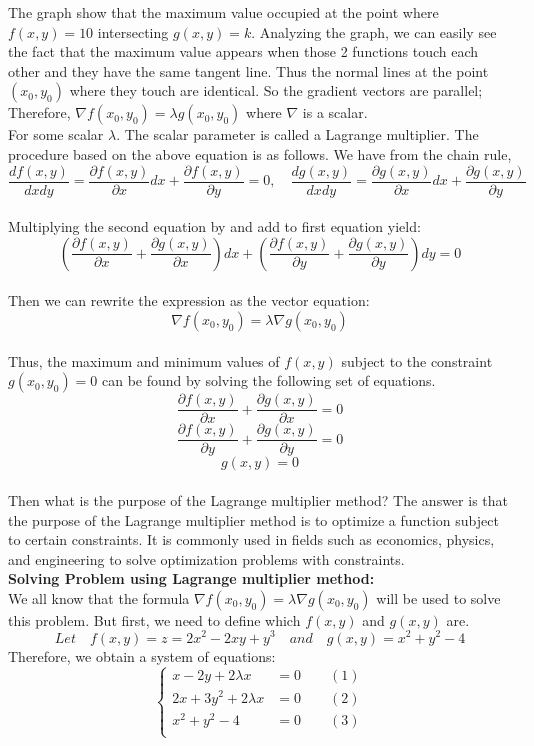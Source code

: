 The graph show that the maximum value occupied at the point where $f(x,y)=10$ intersecting $g(x,y)=k$. Analyzing the graph, we can easily see the fact that the maximum value appears when those 2 functions touch each other and they have the same tangent line. Thus the normal lines at the point $(x_0,y_0)$ where they touch are identical. So the gradient vectors are parallel; Therefore, $\nabla f(x_0,y_0) = \lambda g(x_0,y_0)$ where $\nabla$ is a scalar. \\
For some scalar $\lambda$. The scalar parameter is called a Lagrange multiplier. The procedure based on the above equation is as follows. We have from the chain rule,
$$ \dfrac{df(x, y)}{dxdy} = \dfrac{\partial f(x, y)}{\partial x} dx + \dfrac{\partial f(x, y)}{\partial y} = 0,\quad \dfrac{dg(x, y)}{dxdy} = \dfrac{\partial g(x, y)}{\partial x} dx + \dfrac{\partial g(x, y)}{\partial y} $$ \\[6pt]
Multiplying the second equation by and add to first equation yield:
$$ \left( \dfrac{\partial f(x, y)}{\partial x} + \dfrac{\partial g(x, y)}{\partial x} \right)dx + \left( \dfrac{\partial f(x, y)}{\partial y} + \dfrac{\partial g(x, y)}{\partial y} \right)dy = 0 $$\\[6pt]
Then we can rewrite the expression as the vector equation:
$$ \nabla f(x_0, y_0) =\lambda \nabla g(x_0, y_0) $$\\[6pt]
Thus, the maximum and minimum values of $f(x,y)$ subject to the constraint $g(x_0,y_0)=0$  can be found by solving the following set of equations.
$$ \dfrac{\partial f(x, y)}{\partial x} + \dfrac{\partial g(x, y)}{\partial x} = 0 $$
$$ \dfrac{\partial f(x, y)}{\partial y} + \dfrac{\partial g(x, y)}{\partial y} = 0 $$
$$ g(x, y) = 0 $$\\[6pt]
Then what is the purpose of the Lagrange multiplier method? The answer is that the purpose of the Lagrange multiplier method is to optimize a function subject to certain constraints. It is commonly used in fields such as economics, physics, and engineering to solve optimization problems with constraints.\\[6pt]

\textbf{Solving Problem using Lagrange multiplier method:}\\
We all know that the formula $\nabla f(x_0, y_0) = \lambda \nabla g(x_0, y_0) $ will be used to solve this problem. But first, we need to define which $f(x, y)$ and $g(x, y)$ are.
$$ Let \quad  f(x,y)= z = 2x^2-2xy+y^3 \quad and \quad g(x,y)=x^2 + y^2- 4 $$
Therefore, we obtain a system of equations:
\[
\begin{cases}
  x - 2y + 2 \lambda x &= 0 \qquad (1) \\
  2x + 3y^2 + 2 \lambda x &= 0 \qquad (2) \\
  x^2 + y^2 - 4 &= 0 \qquad (3) \\
\end{cases}
\]

